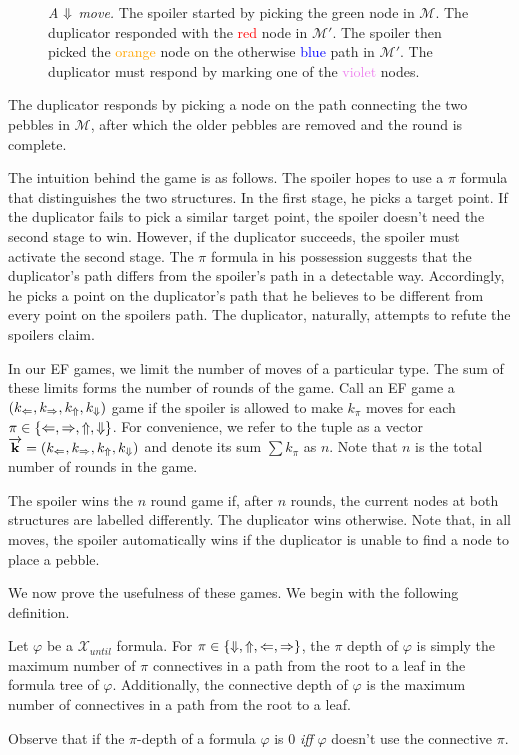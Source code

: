 \documentclass[a4paper,UKenglish,cleveref, autoref, thm-restate, numberwithinsect]{lipics-v2021}
\def\Larrow{\ensuremath\mathord{\Leftarrow}}
\def\Rarrow{\ensuremath\mathord{\Rightarrow}}
\def\Uarrow{\ensuremath\mathord{\Uparrow}}
\def\Darrow{\ensuremath\mathord{\Downarrow}}
\newcommand{\myvec}[1]{\overrightarrow{\mathbf{#1}}}
\begin{document}
\begin{figure}[h]
    \centering
    \caption{\emph{A $\Darrow$ move.} The spoiler started by picking the \textcolor{OliveGreen}{green} node in $\mathcal{M}$. The duplicator responded with the \textcolor{red}{red} node in $\mathcal{M}'$. The spoiler then picked the \textcolor{orange}{orange} node on the otherwise \textcolor{blue}{blue} path in $\mathcal{M}'$. The duplicator must respond by marking one of the \textcolor{violet}{violet} nodes.}
    \label{efgame-intro-fig}
\end{figure}

The duplicator responds by picking a node on the path connecting the two pebbles in $\mathcal{M}$, after which the older pebbles are removed and the round is complete.

The intuition behind the game is as follows. The spoiler hopes to use a $\pi$ formula that distinguishes the two structures. In the first stage, he picks a target point. If the duplicator fails to pick a similar target point, the spoiler doesn't need the second stage to win. However, if the duplicator succeeds, the spoiler must activate the second stage. The $\pi$ formula in his possession suggests that the duplicator's path differs from the spoiler's path in a detectable way. Accordingly, he picks a point on the duplicator's path that he believes to be different from every point on the spoilers path. The duplicator, naturally, attempts to refute the spoilers claim.

In our EF games, we limit the number of moves of a particular type. The sum of these limits forms the number of rounds of the game. Call an EF game a $(k_{\Larrow}, k_{\Rarrow}, k_{\Uarrow}, k_{\Darrow})$ game if the spoiler is allowed to make $k_\pi$ moves for each $\pi \in \{\Larrow, \Rarrow, \Uarrow, \Darrow\}$. For convenience, we refer to the tuple as a vector $\myvec{k} = (k_{\Larrow}, k_{\Rarrow}, k_{\Uarrow}, k_{\Darrow})$ and denote its sum $\sum k_\pi$ as $n$. Note that $n$ is the total number of rounds in the game.

The spoiler wins the $n$ round game if, after $n$ rounds, the current nodes at both structures are labelled differently. The duplicator wins otherwise. Note that, in all moves, the spoiler automatically wins if the duplicator is unable to find a node to place a pebble.

We now prove the usefulness of these games. We begin with the following definition.
\begin{definition}
    Let $\varphi$ be a $\mathcal{X}_{until}$ formula. For $\pi \in \{\Darrow, \Uarrow, \Larrow, \Rarrow\}$, the $\pi$ depth of $\varphi$ is simply the maximum number of $\pi$ connectives in a path from the root to a leaf in the formula tree of $\varphi$. Additionally, the connective depth of $\varphi$ is the maximum number of connectives in a path from the root to a leaf.
\end{definition}
Observe that if the $\pi$-depth of a formula $\varphi$ is $0$ \textit{iff} $\varphi$ doesn't use the connective $\pi$.
\end{document}
